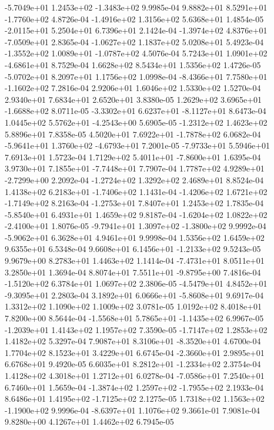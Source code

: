 -5.7049e+01  1.2453e+02 -1.3483e+02  9.9985e-04
 9.8882e+01  8.5291e+01 -1.7760e+02  4.8726e-04
-1.4916e+02  1.3156e+02  5.6368e+01  1.4854e-05
-2.0115e+01  5.2504e+01  6.7396e+01  2.1424e-04
-1.3974e+02  4.8376e+01 -7.0509e+01  2.8365e-04
-1.0627e+02  1.1837e+02  5.0208e+01  5.4923e-04
-1.3552e+02  1.0089e+01 -1.0787e+02  4.5076e-04
 5.7243e+01  1.0901e+02 -4.6861e+01  8.7529e-04
1.6628e+02 8.5434e+01 1.5356e+02  1.4726e-05
-5.0702e+01  8.2097e+01  1.1756e+02  1.0998e-04
-8.4366e+01  7.7580e+01 -1.1602e+02  7.2816e-04
2.9206e+01 1.6046e+02 1.5330e+02  1.5270e-04
2.9340e+01 7.6834e+01 2.6520e+01  3.8380e-05
 1.2629e+02  3.6965e+01 -1.6688e+02  8.0711e-05
-3.3302e+01  6.6237e+01 -8.1127e+01  8.6473e-04
 1.0445e+02  5.5762e+01 -4.2543e+00  5.6905e-05
-1.2312e+02  1.4623e+02  5.8896e+01  7.8358e-05
 4.5020e+01  7.6922e+01 -1.7878e+02  6.0682e-04
-5.9641e+01  1.3760e+02 -4.6793e+01  7.2001e-05
-7.9733e+01  5.5946e+01  7.6913e+01  1.5723e-04
 1.7129e+02  5.4011e+01 -7.8600e+01  1.6395e-04
 3.9730e+01  7.1855e+01 -7.7448e+01  7.7907e-04
 1.7787e+02  4.9289e+01 -2.7299e+00  2.2092e-04
-1.2724e+02  1.3292e+02  2.4689e+01  8.8524e-04
 1.4138e+02  6.2183e+01 -1.7406e+02  1.1431e-04
-1.4206e+02  1.6721e+02 -1.7149e+02  8.2163e-04
-1.2753e+01  7.8407e+01  1.2453e+02  1.7835e-04
-5.8540e+01  6.4931e+01  1.4659e+02  9.8187e-04
-1.6204e+02  1.0822e+02 -2.4100e+01  1.8076e-05
-9.7941e+01  1.3097e+02 -1.3800e+02  9.9992e-04
-5.9062e+01  6.3628e+01  4.9461e+01  9.9998e-04
1.5356e+02 1.6459e+02 9.6355e+01  6.5348e-04
 9.6608e+01  6.1456e+01 -1.2133e+02  9.5243e-05
9.9679e+00 8.2783e+01 1.4463e+02  1.1414e-04
-7.4731e+01  8.0511e+01  3.2850e+01  1.3694e-04
 8.8074e+01  7.5511e+01 -9.8795e+00  7.4816e-04
-1.5120e+02  6.3784e+01  1.0697e+02  2.3806e-05
-4.5479e+01  4.8452e+01 -9.3095e+01  2.2803e-04
 3.1892e+01  6.0666e+01 -5.8608e+01  9.6917e-04
1.3312e+02 1.1090e+02 1.1009e+02  3.0781e-05
1.0192e+02 8.4018e+01 7.8200e+00  8.5644e-04
-1.5568e+01  5.7865e+01 -1.1435e+02  6.9967e-05
-1.2039e+01  1.4143e+02  1.1957e+02  7.3590e-05
-1.7147e+02  1.2853e+02  1.4182e+02  5.3297e-04
 7.9087e+01  8.3106e+01 -8.3520e+01  4.6700e-04
1.7704e+02 8.1523e+01 3.4229e+01  6.6745e-04
-2.3660e+01  2.9895e+01  6.6768e+01  9.4920e-05
 6.6035e+01  8.2812e+01 -1.2334e+02  2.3754e-04
1.4128e+02 4.3018e+01 1.2712e+01  6.0278e-04
-7.0586e+01  7.2540e+01  6.7460e+01  1.5659e-04
-1.3874e+02  1.2597e+02 -1.7955e+02  2.1933e-04
 8.6486e+01  1.4195e+02 -1.7125e+02  2.1275e-05
 1.7318e+02  1.1563e+02 -1.1900e+02  9.9996e-04
-8.6397e+01  1.1076e+02  9.3661e-01  7.9081e-04
9.8280e+00 4.1267e+01 1.4462e+02  6.7945e-05
